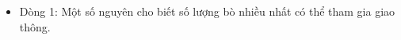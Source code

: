 \begin{itemize}
	\item     Dòng 1: Một số nguyên cho biết số lượng bò nhiều nhất có thể            tham gia giao thông.   
\end{itemize}

\